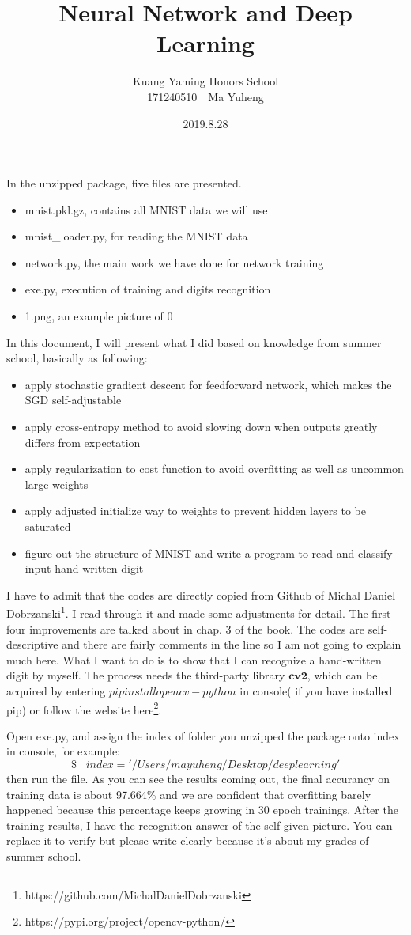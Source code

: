 \documentclass{article}
\begin{document}
\title{ \linespread{1.9}\selectfont 
\Huge{Neural Network and Deep Learning}}
    \author{Kuang Yaming Honors School\\171240510~~Ma Yuheng}
    \date{2019.8.28}
    \maketitle
In the unzipped package, five files are presented. 
\begin{itemize}
\item mnist.pkl.gz, contains all MNIST data we will use
\item mnist\_loader.py, for reading the MNIST data
\item network.py, the main work we have done for network training
\item exe.py, execution of training and digits recognition
\item 1.png, an example picture of 0
\end{itemize}
\par
In this document, I will present what I did based on knowledge from summer school, basically as following:
\begin{itemize}
\item apply stochastic gradient descent for feedforward network, which makes the SGD self-adjustable
\item apply cross-entropy method to avoid slowing down when outputs greatly differs from expectation
\item apply regularization to cost function to avoid overfitting as well as uncommon large weights
\item apply adjusted initialize way to weights to prevent hidden layers to be saturated
\item figure out the structure of MNIST and write a program to read and classify input hand-written digit
\end{itemize}
\par
I have to admit that the codes are directly copied from Github of Michal Daniel Dobrzanski\footnote{https://github.com/MichalDanielDobrzanski}. I read through it and made some adjustments for detail. The first four improvements are talked about in chap. 3 of the book. The codes are self-descriptive and there are fairly comments in the line so I am not going to explain much here. What I want to do is to show that I can recognize a hand-written digit by myself. The process needs the third-party library $\textbf{cv2}$, which can be acquired by entering $pip install opencv-python$ in console( if you have installed pip) or follow the website here\footnote{https://pypi.org/project/opencv-python/}.\par
Open exe.py, and assign the index of folder you unzipped the package onto index in console, for example:
$$ \$\;\;\; index='/Users/mayuheng/Desktop/deeplearning'$$
then run the file. As you can see the results coming out, the final accurancy on training data is about 97.664\% and we are confident that overfitting barely happened because this percentage keeps growing in 30 epoch trainings. After the training results, I have the recognition answer of the self-given picture. You can replace it to verify but please write clearly because it's about my grades of summer school.
\end{document}
